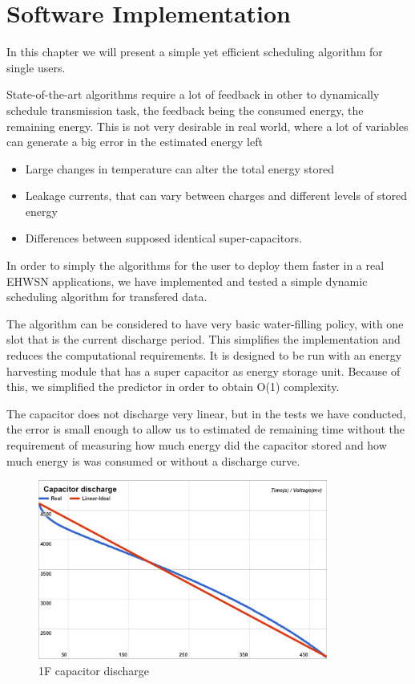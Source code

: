 \normalfont\normalsize
\chapter{Software Implementation}

In this chapter we will present a simple yet efficient scheduling algorithm for single users.

State-of-the-art algorithms require a lot of feedback in other to dynamically schedule transmission
task, the feedback being the consumed energy, the remaining energy. This is not very desirable
in real world, where a lot of variables can generate a big error in the estimated energy left
\begin{itemize}
    \item Large changes in temperature can alter the total energy stored
    \item Leakage currents, that can vary between charges and different levels of stored energy
    \item Differences between supposed identical super-capacitors.
\end{itemize}

In order to simply the algorithms for the user to deploy them faster in a real EHWSN applications,
we have implemented and tested a simple dynamic scheduling algorithm for transfered data.

The algorithm can be considered to have very basic water-filling policy, with one slot that is
the current discharge period. This simplifies the implementation and reduces the computational
requirements. It is designed to be run with an energy harvesting module that has a super capacitor
as energy storage unit. Because of this, we simplified the predictor in order to obtain O(1)
complexity.

The capacitor does not discharge very linear, but in the tests we have conducted, the error is
small enough to allow us to estimated de remaining time without the requirement of measuring how
much energy did the capacitor stored and how much energy is was consumed or without a discharge
curve.


\begin{figure}[ht] \centering
\includegraphics[width=0.85\textwidth]{img/capacitor.png}
\caption{1F capacitor discharge}
\end{figure}


